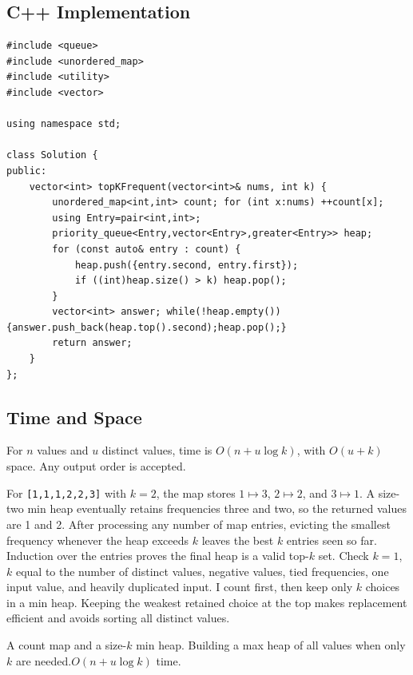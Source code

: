 \subsection{C++ Implementation}
\begin{lstlisting}[style=compactcode,caption={Complete C++ solution: Top K Frequent Elements}]
#include <queue>
#include <unordered_map>
#include <utility>
#include <vector>

using namespace std;

class Solution {
public:
    vector<int> topKFrequent(vector<int>& nums, int k) {
        unordered_map<int,int> count; for (int x:nums) ++count[x];
        using Entry=pair<int,int>;
        priority_queue<Entry,vector<Entry>,greater<Entry>> heap;
        for (const auto& entry : count) {
            heap.push({entry.second, entry.first});
            if ((int)heap.size() > k) heap.pop();
        }
        vector<int> answer; while(!heap.empty()){answer.push_back(heap.top().second);heap.pop();}
        return answer;
    }
};
\end{lstlisting}

\subsection{Time and Space}
For \(n\) values and \(u\) distinct values, time is \(O(n+u\log k)\), with
\(O(u+k)\) space. Any output order is accepted.

\lessonexpansion
  {For \texttt{[1,1,1,2,2,3]} with \(k=2\), the map stores
   \(1\mapsto3\), \(2\mapsto2\), and \(3\mapsto1\). A size-two min heap
   eventually retains frequencies three and two, so the returned values are
   1 and 2.}
  {After processing any number of map entries, evicting the smallest frequency
   whenever the heap exceeds \(k\) leaves the best \(k\) entries seen so far.
   Induction over the entries proves the final heap is a valid top-\(k\) set.}
  {Check \(k=1\), \(k\) equal to the number of distinct values, negative
   values, tied frequencies, one input value, and heavily duplicated input.}
  {I count first, then keep only \(k\) choices in a min heap. Keeping
   the weakest retained choice at the top makes replacement efficient and
   avoids sorting all distinct values.}

  {A count map and a size-$k$ min heap.}
  {Building a max heap of all values when only $k$ are needed.}{$O(n+u\log k)$ time.}